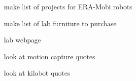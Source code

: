 

make list of projects for ERA-Mobi robots
	

make list of lab furniture to purchase


lab webpage


look at motion capture quotes 


look at kilobot quotes


